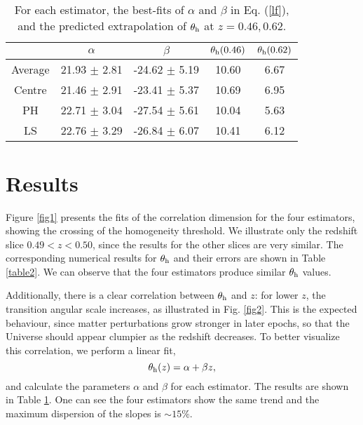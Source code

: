 \documentclass[useAMS,usenatbib]{mn2e}
\def \be {\begin{equation}}
\def \ee {\end{equation}}
\begin{document}
\begin{table}
\begin{tabular}{|c|c|c|c|c|}
\hline
& $\alpha$ & $\beta$ & $\theta_{\rm h}(0.46) $ & $\theta_{\rm h}(0.62)$ \\
\hline
Average & 21.93 $\pm$ 2.81 & -24.62 $\pm$ 5.19 & 10.60 & 6.67 \\ \hline
Centre  & 21.46 $\pm$ 2.91 & -23.41 $\pm$ 5.37 & 10.69 & 6.95 \\ \hline
PH      & 22.71 $\pm$ 3.04 & -27.54 $\pm$ 5.61 & 10.04 & 5.63 \\ \hline
LS      & 22.76 $\pm$ 3.29 & -26.84 $\pm$ 6.07 & 10.41 & 6.12 \\ \hline
\end{tabular}
\caption{
For each estimator, the best-fits of $\alpha$ and $\beta$ in Eq. (\ref{lf}), and the predicted extrapolation of $\theta_{\rm h}$ 
at $z=0.46,0.62$. 
}
\label{table3}
\end{table}
\noindent

\section{Results}

Figure \ref{fig1} presents the fits of the correlation dimension for the four estimators, showing the crossing of the homogeneity threshold. We illustrate only the redshift slice $0.49 < z < 0.50$, since the results for the other slices are very similar. The corresponding numerical results for $\theta_{\rm h}$ and their errors are shown in Table \ref{table2}. We can observe that the four estimators produce similar $\theta_{\rm h}$ values.

Additionally, there is a clear correlation between $\theta_{\rm h}$ and $z$: for lower $z$, the transition angular scale increases, as illustrated in Fig. \ref{fig2}. This is the expected behaviour, since matter perturbations grow stronger in later epochs, so that the Universe should appear clumpier as the redshift decreases. To better visualize this correlation, we perform a linear fit, 
\be\label{lf}
\theta_{\rm h}(z) = \alpha + \beta z,
\ee 
and calculate the parameters $\alpha$ and $\beta$ for each estimator. The results are shown in Table \ref{table3}. One can see the four estimators show the same trend and the maximum dispersion of the slopes is $\sim 15\%$.
\end{document}
